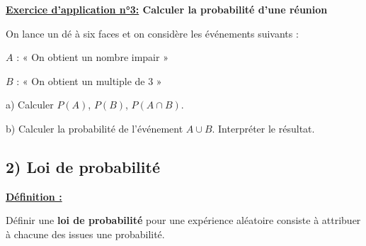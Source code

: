 \documentclass[12pt]{article}
\begin{document}
\begin{mdframed}[
    linewidth=1pt,
    roundcorner=5pt,
    linecolor=RoyalBlue,
    innertopmargin=10pt,
    innerbottommargin=10pt
]
{\color{RoyalBlue}
\textbf{\underline{Exercice d'application n°3:} Calculer la probabilité d'une réunion}}

\vspace{5pt}
On lance un dé à six faces et on considère les événements suivants :

$A$ : « On obtient un nombre impair »

$B$ : « On obtient un multiple de 3 »

\vspace{5pt}
\hspace{0.5cm} a) Calculer $P(A)$, $P(B)$, $P(A \cap B)$.

\hspace{0.5cm} b) Calculer la probabilité de l’événement $A \cup B$. Interpréter le résultat.

\vspace{0.5cm}
{\color{black!30}\dotfill}

\vspace{0.5cm}
{\color{black!30}\dotfill}

\vspace{0.5cm}
{\color{black!30}\dotfill}

\vspace{0.5cm}
{\color{black!30}\dotfill}

\vspace{0.5cm}
{\color{black!30}\dotfill}

\vspace{0.5cm}
{\color{black!30}\dotfill}

\vspace{0.5cm}
{\color{black!30}\dotfill}

\vspace{0.5cm}
{\color{black!30}\dotfill}

\vspace{20pt}

\end{mdframed}

\subsection*{\hspace{1cm} 2) Loi de probabilité}

\vspace{5pt}
\begin{mdframed}[
    linewidth=1pt,
    roundcorner=5pt,
    linecolor=ForestGreen,
    innertopmargin=10pt,
    innerbottommargin=10pt
]
{\color{ForestGreen}
\textbf{\underline{Définition :}}}

\vspace{5pt}
Définir une \textbf{loi de probabilité} pour une expérience aléatoire consiste à attribuer à chacune des issues 
une probabilité.

\end{mdframed}
\end{document}

